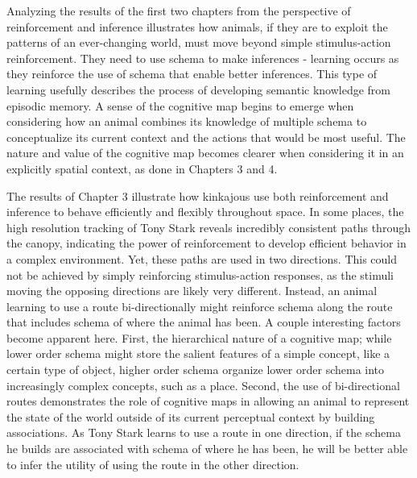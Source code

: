 \documentclass[twoside,12pt,final]{ucthesis-CA2012}
\begin{document}
\begin{ucmainmatter}
Analyzing the results of the first two chapters from the perspective of reinforcement and inference illustrates how animals, if they are to exploit the patterns of an ever-changing world, must move beyond simple stimulus-action reinforcement. They need to use schema to make inferences - learning occurs as they reinforce the use of schema that enable better inferences. This type of learning usefully describes the process of developing semantic knowledge from episodic memory. A sense of the cognitive map begins to emerge when considering how an animal combines its knowledge of multiple schema to conceptualize its current context and the actions that would be most useful. The nature and value of the cognitive map becomes clearer when considering it in an explicitly spatial context, as done in Chapters 3 and 4.

The results of Chapter 3 illustrate how kinkajous use both reinforcement and inference to behave efficiently and flexibly throughout space. In some places, the high resolution tracking of Tony Stark reveals incredibly consistent paths through the canopy, indicating the power of reinforcement to develop efficient behavior in a complex environment. Yet, these paths are used in two directions. This could not be achieved by simply reinforcing stimulus-action responses, as the stimuli moving the opposing directions are likely very different. Instead, an animal learning to use a route bi-directionally might reinforce schema along the route that includes schema of where the animal has been. A couple interesting factors become apparent here. First, the hierarchical nature of a cognitive map; while lower order schema might store the salient features of a simple concept, like a certain type of object, higher order schema organize lower order schema into increasingly complex concepts, such as a place. Second, the use of bi-directional routes demonstrates the role of cognitive maps in allowing an animal to represent the state of the world outside of its current perceptual context by building associations. As Tony Stark learns to use a route in one direction, if the schema he builds are associated with schema of where he has been, he will be better able to infer the utility of using the route in the other direction.


\end{ucmainmatter}
\end{document}
